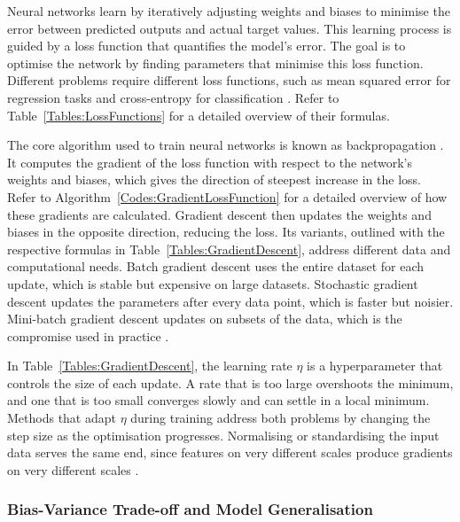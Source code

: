 Neural networks learn by iteratively adjusting weights and biases to minimise the error between predicted outputs and actual target values. This learning process is guided by a loss function that quantifies the model's error. The goal is to optimise the network by finding parameters that minimise this loss function. Different problems require different loss functions, such as mean squared error for regression tasks and cross-entropy for classification \cite{goodfellow_deep_2016}. Refer to Table~\ref{Tables:LossFunctions} for a detailed overview of their formulas.



The core algorithm used to train neural networks is known as backpropagation \cite{rumelhart_learning_1986}. It computes the gradient of the loss function with respect to the network's weights and biases, which gives the direction of steepest increase in the loss. Refer to Algorithm~\ref{Codes:GradientLossFunction} for a detailed overview of how these gradients are calculated. Gradient descent then updates the weights and biases in the opposite direction, reducing the loss. Its variants, outlined with the respective formulas in Table~\ref{Tables:GradientDescent}, address different data and computational needs. Batch gradient descent uses the entire dataset for each update, which is stable but expensive on large datasets. Stochastic gradient descent updates the parameters after every data point, which is faster but noisier. Mini-batch gradient descent updates on subsets of the data, which is the compromise used in practice \cite{goodfellow_deep_2016}.



In Table~\ref{Tables:GradientDescent}, the learning rate \( \eta \) is a hyperparameter that controls the size of each update. A rate that is too large overshoots the minimum, and one that is too small converges slowly and can settle in a local minimum. Methods that adapt \( \eta \) during training address both problems by changing the step size as the optimisation progresses. Normalising or standardising the input data serves the same end, since features on very different scales produce gradients on very different scales \cite{goodfellow_deep_2016}.



\subsubsection{Bias-Variance Trade-off and Model Generalisation}

